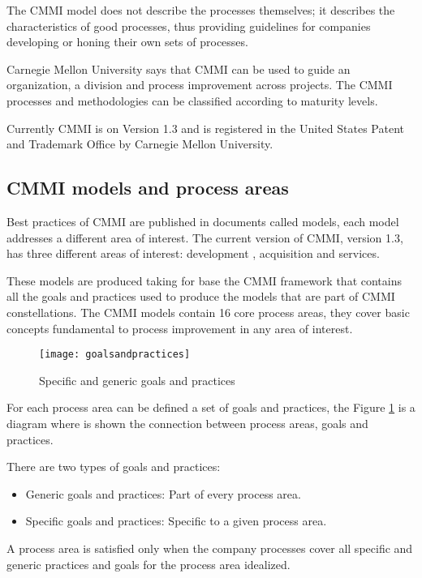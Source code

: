 The CMMI model does not describe the processes themselves; it describes the characteristics of good processes, thus providing guidelines for companies developing or honing their own sets of processes.

Carnegie Mellon University says that CMMI can be used to guide an organization, a division and process improvement across projects. The CMMI processes and methodologies can be classified according to maturity levels.

Currently CMMI is on Version 1.3 and is registered in the United States Patent and Trademark Office by Carnegie Mellon University.

\subsection{CMMI models and process areas}
Best practices of CMMI are published in documents called models, each model addresses a different area of interest. The current version of CMMI, version 1.3, has three different areas of interest: development \citep{Chrissis2006}, acquisition and services.

These models are produced taking for base the CMMI framework that contains all the goals and practices used to produce the models that are part of CMMI constellations. The CMMI models contain 16 core process areas, they cover basic concepts fundamental to process improvement in any area of interest. 

\begin{figure}[h]
	\begin{center}
		\leavevmode
		\texttt{[image: goalsandpractices]}
		\caption{Specific and generic goals and practices}
		\label{fig:goalsandpractices}
	\end{center}
\end{figure}


For each process area can be defined a set of goals and practices, the Figure \ref{fig:goalsandpractices} is a diagram where is shown the connection between process areas, goals and practices. 

There are two types of goals and practices:
\begin{itemize}
	\item Generic goals and practices: Part of every process area.
	\item Specific goals and practices: Specific to a given process area.
\end{itemize}

A process area is satisfied only when the company processes cover all specific and generic practices and goals for the process area idealized.

